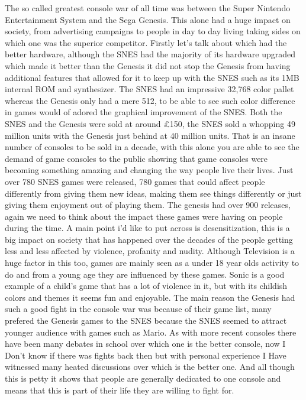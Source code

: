 \documentclass{scrartcl}
\begin{document}
The so called greatest console war of all time was between the Super Nintendo Entertainment System and the Sega Genesis. This alone had a huge impact on society, from advertising campaigns to people in day to day living taking sides on which one was the superior competitor. Firstly let's talk about which had the better hardware, although the SNES had the majority of its hardware upgraded which made it better than the Genesis it did not stop the Genesis from having additional features that allowed for it to keep up with the SNES such as its 1MB internal ROM and synthesizer. The SNES had an impressive 32,768 color pallet whereas the Genesis only had a mere 512, to be able to see such color difference in games would of adored the graphical improvement of the SNES. Both the SNES and the Genesis were sold at around £150, the SNES sold a whopping 49 million units with the Genesis just behind at 40 million units. That is an insane number of consoles to be sold in a decade, with this alone you are able to see the demand of game consoles to the public showing that game consoles were becoming something amazing and changing the way people live their lives. Just over 780 SNES games were released, 780 games that could affect people differently from giving them new ideas, making them see things differently or just giving them enjoyment out of playing them. The genesis had over 900 releases, again we need to think about the impact these games were having on people during the time. 
A main point i’d like to put across is desensitization, this is a big impact on society that has happened over the decades of the people getting less and less affected by violence, profanity and nudity. Although Television is a huge factor in this too, games are mainly seen as a under 18 year olds activity to do and from a young age they are influenced by these games. Sonic is a good example of a child's game that has a lot of violence in it, but with its childish colors and themes it seems fun and enjoyable. The main reason the Genesis had such a good fight in the console war was because of their game list, many prefered the Genesis games to the SNES because the SNES seemed to attract younger audience with games such as Mario. As with more recent consoles there have been many debates in school over which one is the better console, now I Don't know if there was fights back then but with personal experience I Have witnessed many heated discussions over which is the better one. And all though this is petty it shows that people are generally dedicated to one console and means that this is part of their life they are willing to fight for.
\end{document}
